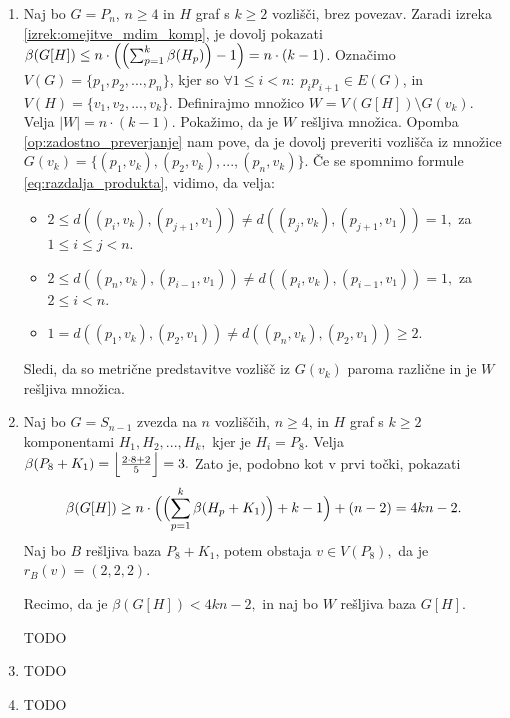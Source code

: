 \documentclass[mat1, tisk]{fmfdelo}
\begin{document}
    \begin{dokaz}
        \begin{enumerate}
            \item Naj bo $G = P_n$, $n\geq 4$ in $H$ graf s $k\geq 2$ vozlišči, brez povezav. 
            Zaradi izreka \ref{izrek:omejitve_mdim_komp}, je dovolj pokazati 
            $\beta(G[H]) \leq n \cdot \Bigl ( \Bigl ( \sum_{p=1}^{k} \beta(H_p) \Bigr )  - 1  \Bigr ) = n 
            \cdot (k - 1)$. Označimo $V(G) = \{p_1 , p_2, ..., p_n\}$, kjer so $\forall 1 \leq i < n : \; 
            p_i p_{i+1} \in E(G)$, in $V(H) = \{ v_1, v_2, ..., v_k\}.$ Definirajmo množico 
            $W = V(G[H]) \setminus G(v_k).$ Velja $|W| = n \cdot (k-1).$ 
            Pokažimo, da je $W$ rešljiva množica. Opomba \ref{op:zadostno_preverjanje} nam pove, da je dovolj preveriti
            vozlišča iz množice $G(v_k) = \{ (p_1, v_k), (p_2, v_k), ..., (p_n, v_k)\}$. Če se spomnimo formule
            \ref{eq:razdalja_produkta}, vidimo, da velja:
            \begin{itemize}
                \item $2 \leq d((p_i, v_k), (p_{j+1}, v_1)) \neq d((p_j, v_k), (p_{j + 1}, v_1)) = 1,$ 
                za $ 1 \leq i \leq j < n $.
                \item $2 \leq d((p_n, v_k), (p_{i-1}, v_1)) \neq d((p_i, v_k), (p_{i- 1}, v_1)) = 1,$ 
                za $ 2 \leq i < n $.
                \item $1 = d((p_1, v_k), (p_2, v_1)) \neq d((p_n, v_k), (p_2, v_1)) \geq 2.$
            \end{itemize}
            Sledi, da so metrične predstavitve vozlišč iz $G(v_k)$ paroma različne in je $W$ rešljiva množica.
    
            \item Naj bo $G = S_{n-1}$ zvezda na $n$ vozliščih, $n\geq 4$, in $H$ graf s $k \geq 2$ komponentami
            $H_1, H_2, ..., H_k,$ kjer je $H_i = P_8.$ Velja $\beta(P_8 + K_1) = 
            \Bigl \lfloor \frac{2\cdot 8 + 2}{5} \Bigr \rfloor = 3. $ %
            Zato je, podobno kot v prvi točki, pokazati  
            $$\beta(G[H]) \geq n \cdot \Bigl ( \Bigl ( \sum_{p=1}^{k} \beta(H_p + K_1) \Bigr ) + k - 1 \Bigr ) + 
            (n-2) = 4kn - 2.$$ 
            Naj bo $B$ rešljiva baza $P_8 + K_1$, potem obstaja $v \in V(P_8),$ da je $r_B(v) = (2, 2, 2).$
    
            Recimo, da je $\beta(G[H]) < 4kn - 2,$ in naj bo $W$ rešljiva baza $G[H]$. 
            
            TODO
    
            \item TODO
            \item TODO
    
        \end{enumerate}
    \end{dokaz}
\end{document}
